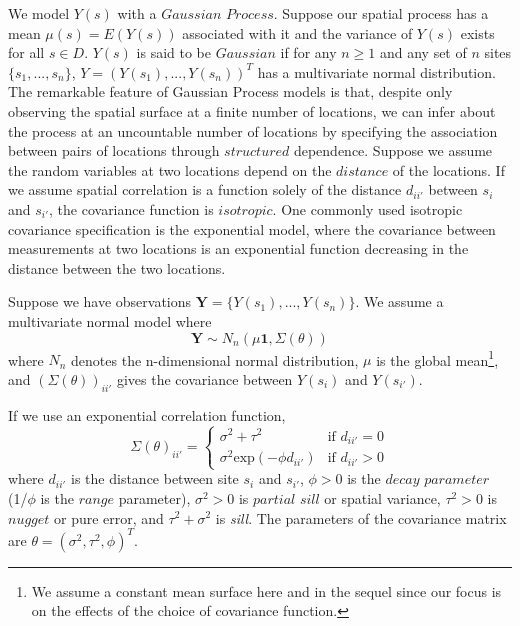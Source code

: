 \documentclass[12pt,twoside]{dukestatscithesis}
\theoremstyle{definition}
\theoremstyle{definition}
\theoremstyle{definition}
\theoremstyle{remark}
\begin{document}
We model \(Y(s)\) with a \(\textit{Gaussian Process}\). Suppose our
spatial process has a mean \(\mu(s) = E(Y(s))\) associated with it and
the variance of \(Y(s)\) exists for all \(s \in D\). \(Y(s)\) is said to
be \(\textit{Gaussian}\) if for any \(n \ge 1\) and any set of \(n\)
sites \(\{s_1, ..., s_n\}\), \(Y = (Y(s_1), ..., Y(s_n))^T\) has a
multivariate normal distribution. The remarkable feature of Gaussian
Process models is that, despite only observing the spatial surface at a
finite number of locations, we can infer about the process at an
uncountable number of locations by specifying the association between
pairs of locations through \(\textit{structured}\) dependence. Suppose
we assume the random variables at two locations depend on the
\(\textit{distance}\) of the locations. If we assume spatial correlation
is a function solely of the distance \(d_{ii'}\) between \(s_i\) and
\(s_{i'}\), the covariance function is \(\textit{isotropic}\). One
commonly used isotropic covariance specification is the exponential
model, where the covariance between measurements at two locations is an
exponential function decreasing in the distance between the two
locations.

Suppose we have observations
\(\textbf{Y} = \{Y(s_1), . . . , Y(s_n)\}\). We assume a multivariate
normal model where
\begin{equation}
\textbf{Y} \sim N_n(\mu \textbf{1},  \Sigma(\theta))
\end{equation}
where \(N_n\) denotes the n-dimensional normal distribution, \(\mu\) is
the global mean\footnote{We assume a constant mean surface here and in
  the sequel since our focus is on the effects of the choice of
  covariance function.}, and \((\Sigma(\theta))_{ii'}\) gives the
covariance between \(Y(s_i)\) and \(Y(s_{i'})\).

If we use an exponential correlation function,
\begin{equation}
\Sigma{(\theta)}_{ii'} = \begin{cases}
\sigma^2 + \tau^2 & \text{if $d_{ii'}=0$}\\
\sigma^2\text{exp}(-\phi d_{ii'}) & \text{if $d_{ii'}>0$}
\end{cases}
\end{equation}
where \(d_{ii'}\) is the distance between site \(s_i\) and \(s_{i'}\),
\(\phi > 0\) is the \(\textit{decay parameter}\) (1/\(\phi\) is the
\(\textit{range}\) parameter), \(\sigma^2 > 0\) is
\(\textit{partial sill}\) or spatial variance, \(\tau^2 > 0\) is
\(\textit{nugget}\) or pure error, and \(\tau^2 + \sigma^2\) is
\textit{sill}. The parameters of the covariance matrix are
\(\theta = (\sigma^2, \tau^2, \phi)^T\).
\end{document}
